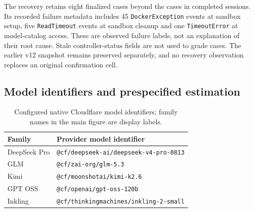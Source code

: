 \begin{table}[t]
\centering\small
\caption{Separate exploratory recovery at its frozen capture. Assigned session
counts vary by model and sum to 75; assigned cases sum to 150. There are
19 completed, 51 failed and five interrupted journal dispositions, with no
pending or running assignments. Finalized case evidence survives an enclosing-run failure. Unresolved
outcomes stay in the assigned denominators. These attempts do not replace
confirmation failures or enter Figure~\ref{fig:collection-outcomes}.}
\label{tab:collection-recovery}

\end{table}

The recovery retains eight finalized cases beyond the cases in completed
sessions. Its recorded failure metadata includes 45 \texttt{DockerException}
events at sandbox setup, five \texttt{ReadTimeout} events at sandbox cleanup
and one \texttt{TimeoutError} at model-catalog access. These are observed
failure labels, not an explanation of their root cause. Stale controller-status
fields are not used to grade cases. The earlier v12 snapshot remains preserved
separately, and no recovery observation replaces an original confirmation cell.

\subsection{Model identifiers and prespecified estimation}
\label{app:estimation}
\begin{table}[t]
\centering\small
\caption{Configured native Cloudflare model identifiers; family names in the
main figure are display labels.}
\label{tab:models}
\begin{tabular}{ll}
\toprule Family & Provider model identifier\\
\midrule
DeepSeek Pro & \texttt{@cf/deepseek-ai/deepseek-v4-pro-0813}\\
GLM & \texttt{@cf/zai-org/glm-5.3}\\
Kimi & \texttt{@cf/moonshotai/kimi-k2.6}\\
GPT OSS & \texttt{@cf/openai/gpt-oss-120b}\\
Inkling & \texttt{@cf/thinkingmachines/inkling-2-small}\\
\bottomrule
\end{tabular}
\end{table}

